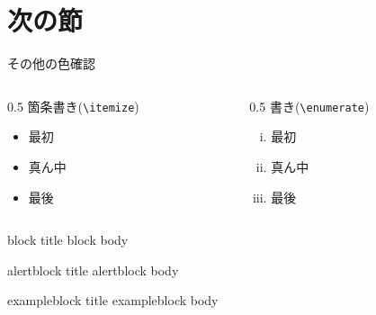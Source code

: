 \documentclass[../main]{subfiles}
\begin{document}
\section{次の節}
\begin{frame}{その他の色確認}{}
  \begin{columns}
    \begin{column}[t]{0.5\textwidth}
      箇条書き(\texttt{\textbackslash itemize})
      \begin{itemize}
        \item 最初
        \item 真ん中
        \item 最後
      \end{itemize}
    \end{column}
    \begin{column}[t]{0.5\textwidth}
      書き(\texttt{\textbackslash enumerate})
      \begin{enumerate}[(i)]
        \item 最初
        \item 真ん中
        \item 最後
      \end{enumerate}
    \end{column}
  \end{columns}

  \begin{block}{block title}
    block body
  \end{block}
  \begin{alertblock}{alertblock title}
    alertblock body
  \end{alertblock}
  \begin{exampleblock}{exampleblock title}
    exampleblock body
  \end{exampleblock}
\end{frame}
\end{document}
